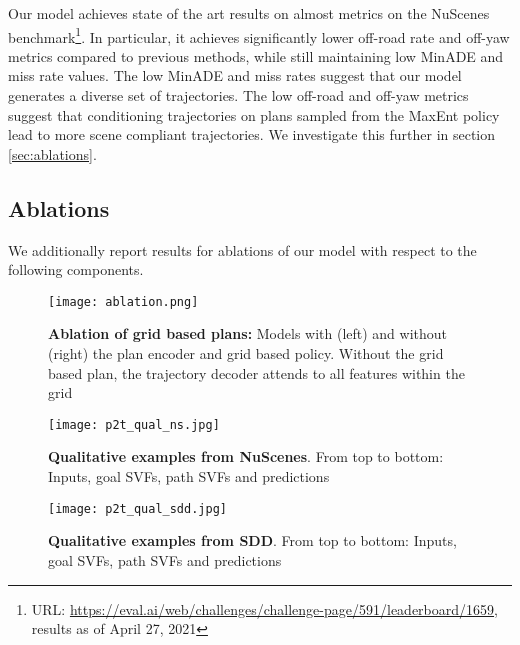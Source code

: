 \documentclass[journal]{IEEEtran}
\begin{document}
Our model achieves state of the art results on almost metrics on the NuScenes benchmark\footnote{URL: \href{https://eval.ai/web/challenges/challenge-page/591/leaderboard/1659}{ https://eval.ai/web/challenges/challenge-page/591/leaderboard/1659}, results as of April 27, 2021}. In particular, it achieves significantly lower off-road rate and off-yaw metrics compared to previous methods, while still maintaining low MinADE and miss rate values. The low MinADE and miss rates suggest that our model generates a diverse set of trajectories. The low off-road and off-yaw metrics suggest that conditioning trajectories on plans sampled from the MaxEnt policy lead to more scene compliant trajectories. We investigate this further in section \ref{sec:ablations}.    

\subsection{Ablations}

We additionally report results for ablations of our model with respect to the following components. 

\label{sec:ablations}














\begin{figure}[t]
\centering
\texttt{[image: ablation.png]}
\caption{\textbf{Ablation of grid based plans:} Models with (left) and without (right) the plan encoder and grid based policy. Without the grid based plan, the trajectory decoder attends to all features within the grid} 
\label{fig:ablation}
\end{figure}

\begin{figure*}[t]
\centering
\texttt{[image: p2t\_qual\_ns.jpg]}
\caption{\textbf{Qualitative examples from NuScenes}. From top to bottom: Inputs, goal SVFs, path SVFs and predictions} 
\label{fig:qual_ns}
\end{figure*}

\begin{figure*}[t]
\centering
\texttt{[image: p2t\_qual\_sdd.jpg]}
\caption{\textbf{Qualitative examples from SDD}. From top to bottom: Inputs, goal SVFs, path SVFs and predictions} 
\label{fig:qual_sdd}
\end{figure*}
\end{document}
